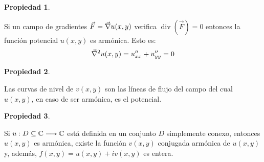 \documentclass[a5paper,12pt,twoside]{book}
\newtheorem{prop}{{Propiedad}}[chapter]
\begin{document}
\begin{mdframed}[style=MyFrame1]
    \begin{prop}
    \end{prop}
    Si un campo de gradientes $\Vec{F}=\Vec{\nabla} u(x,y)$ verifica $\operatorname{div}(\Vec{F})=0$ entonces la función potencial $u(x,y)$ es armónica. Esto es:
    \begin{equation*}
        \Vec{\nabla}^2 u(x,y) = u_{xx}'' + u_{yy}'' = 0
    \end{equation*}
\end{mdframed}

\begin{mdframed}[style=MyFrame1]
    \begin{prop}
    \end{prop}
    Las curvas de nivel de $v(x,y)$ son las líneas de flujo del campo del cual $u(x,y)$, en caso de ser armónica, es el potencial.
\end{mdframed}

\begin{mdframed}[style=MyFrame1]
    \begin{prop}
    \end{prop}
    Si $u: D \subseteq \mathbb{C} \longrightarrow \mathbb{C}$ está definida en un conjunto $D$ simplemente conexo, entonces $u(x,y)$ es armónica, existe la función $v(x,y)$ conjugada armónica de $u(x,y)$ y, además, $f(x,y)=u(x,y)+iv(x,y)$ es entera.
\end{mdframed}

\end{document}
